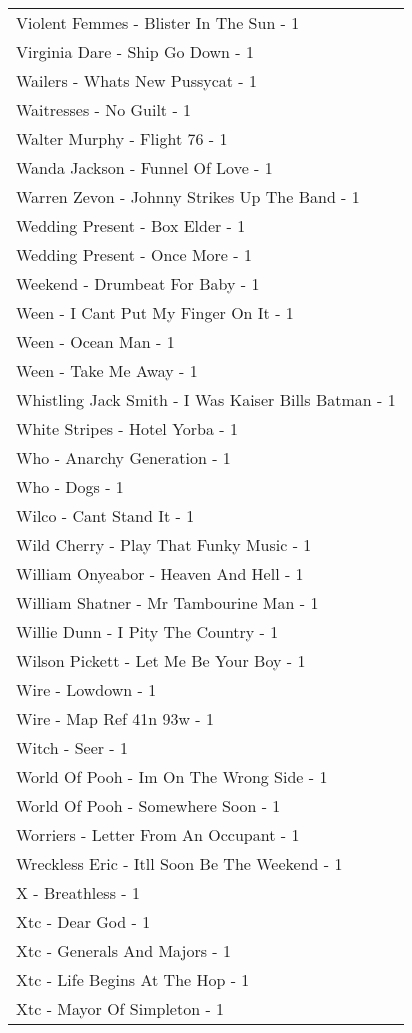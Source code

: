 \documentclass[
]{article}
\begin{document}
\begin{longtable}{l}
Violent Femmes - Blister In The Sun - 1 \\ 
Virginia Dare - Ship Go Down - 1 \\ 
Wailers - Whats New Pussycat - 1 \\ 
Waitresses - No Guilt - 1 \\ 
Walter Murphy - Flight 76 - 1 \\ 
Wanda Jackson - Funnel Of Love - 1 \\ 
Warren Zevon - Johnny Strikes Up The Band - 1 \\ 
Wedding Present - Box Elder - 1 \\ 
Wedding Present - Once More - 1 \\ 
Weekend - Drumbeat For Baby - 1 \\ 
Ween - I Cant Put My Finger On It - 1 \\ 
Ween - Ocean Man - 1 \\ 
Ween - Take Me Away - 1 \\ 
Whistling Jack Smith - I Was Kaiser Bills Batman - 1 \\ 
White Stripes - Hotel Yorba - 1 \\ 
Who - Anarchy Generation - 1 \\ 
Who - Dogs - 1 \\ 
Wilco - Cant Stand It - 1 \\ 
Wild Cherry - Play That Funky Music - 1 \\ 
William Onyeabor - Heaven And Hell - 1 \\ 
William Shatner - Mr Tambourine Man - 1 \\ 
Willie Dunn - I Pity The Country - 1 \\ 
Wilson Pickett - Let Me Be Your Boy - 1 \\ 
Wire - Lowdown - 1 \\ 
Wire - Map Ref 41n 93w - 1 \\ 
Witch - Seer - 1 \\ 
World Of Pooh - Im On The Wrong Side - 1 \\ 
World Of Pooh - Somewhere Soon - 1 \\ 
Worriers - Letter From An Occupant - 1 \\ 
Wreckless Eric - Itll Soon Be The Weekend - 1 \\ 
X - Breathless - 1 \\ 
Xtc - Dear God - 1 \\ 
Xtc - Generals And Majors - 1 \\ 
Xtc - Life Begins At The Hop - 1 \\ 
Xtc - Mayor Of Simpleton - 1 \\ 

\end{longtable}
\end{document}
